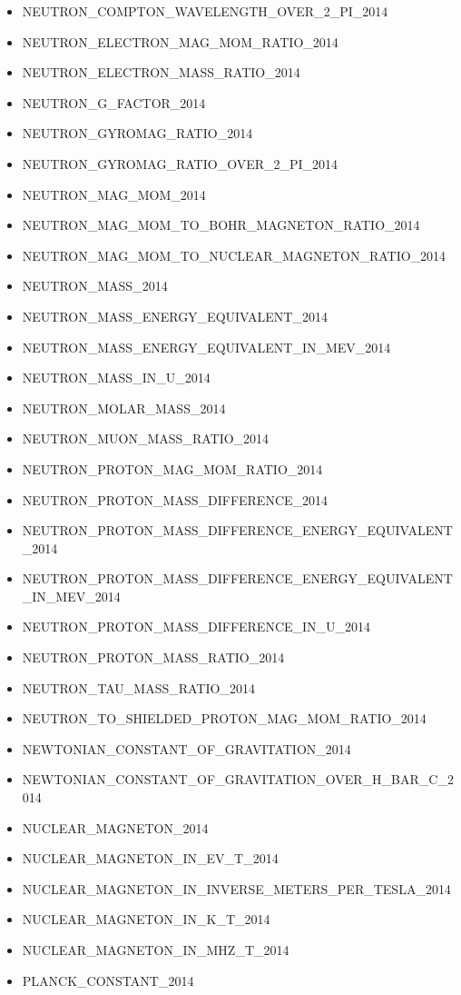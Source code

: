 \begin{itemize}
\item NEUTRON\_COMPTON\_WAVELENGTH\_OVER\_2\_PI\_2014
\item NEUTRON\_ELECTRON\_MAG\_MOM\_RATIO\_2014
\item NEUTRON\_ELECTRON\_MASS\_RATIO\_2014
\item NEUTRON\_G\_FACTOR\_2014
\item NEUTRON\_GYROMAG\_RATIO\_2014
\item NEUTRON\_GYROMAG\_RATIO\_OVER\_2\_PI\_2014
\item NEUTRON\_MAG\_MOM\_2014
\item NEUTRON\_MAG\_MOM\_TO\_BOHR\_MAGNETON\_RATIO\_2014
\item NEUTRON\_MAG\_MOM\_TO\_NUCLEAR\_MAGNETON\_RATIO\_2014
\item NEUTRON\_MASS\_2014
\item NEUTRON\_MASS\_ENERGY\_EQUIVALENT\_2014
\item NEUTRON\_MASS\_ENERGY\_EQUIVALENT\_IN\_MEV\_2014
\item NEUTRON\_MASS\_IN\_U\_2014
\item NEUTRON\_MOLAR\_MASS\_2014
\item NEUTRON\_MUON\_MASS\_RATIO\_2014
\item NEUTRON\_PROTON\_MAG\_MOM\_RATIO\_2014
\item NEUTRON\_PROTON\_MASS\_DIFFERENCE\_2014
\item NEUTRON\_PROTON\_MASS\_DIFFERENCE\_ENERGY\_EQUIVALENT\_2014
\item NEUTRON\_PROTON\_MASS\_DIFFERENCE\_ENERGY\_EQUIVALENT\_IN\_MEV\_2014
\item NEUTRON\_PROTON\_MASS\_DIFFERENCE\_IN\_U\_2014
\item NEUTRON\_PROTON\_MASS\_RATIO\_2014
\item NEUTRON\_TAU\_MASS\_RATIO\_2014
\item NEUTRON\_TO\_SHIELDED\_PROTON\_MAG\_MOM\_RATIO\_2014
\item NEWTONIAN\_CONSTANT\_OF\_GRAVITATION\_2014
\item NEWTONIAN\_CONSTANT\_OF\_GRAVITATION\_OVER\_H\_BAR\_C\_2014
\item NUCLEAR\_MAGNETON\_2014
\item NUCLEAR\_MAGNETON\_IN\_EV\_T\_2014
\item NUCLEAR\_MAGNETON\_IN\_INVERSE\_METERS\_PER\_TESLA\_2014
\item NUCLEAR\_MAGNETON\_IN\_K\_T\_2014
\item NUCLEAR\_MAGNETON\_IN\_MHZ\_T\_2014
\item PLANCK\_CONSTANT\_2014

\end{itemize}

